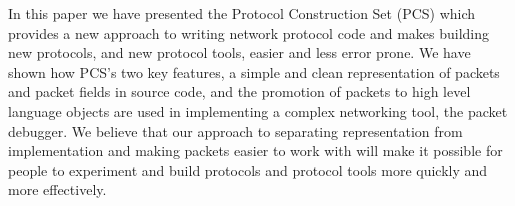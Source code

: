 \documentclass[pdftex]{article}
\begin{document}
In this paper we have presented the Protocol Construction Set (PCS)
which provides a new approach to writing network protocol code and
makes building new protocols, and new protocol tools, easier and less
error prone.  We have shown how PCS's two key features, a simple and
clean representation of packets and packet fields in source code, and
the promotion of packets to high level language objects are used in
implementing a complex networking tool, the packet debugger.  We
believe that our approach to separating representation from
implementation and making packets easier to work with will make it
possible for people to experiment and build protocols and protocol
tools more quickly and more effectively.



\end{document}
